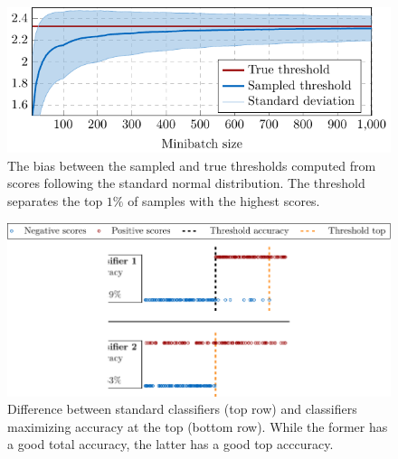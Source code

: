 \begin{figure}[!ht]
  \centering
  \includegraphics[width = \linewidth]{images/deep_threshold_bias.pdf}
  \caption{The bias between the sampled and true thresholds computed from scores following the standard normal distribution. The threshold separates the top $1\%$ of samples with the highest scores.}
  \label{fig:thresholds1}
\end{figure}

\begin{figure}[!ht]
  \centering
  \includegraphics[width = \linewidth]{images/deep_aatp_example.pdf}
  \caption{Difference between standard classifiers (top row) and classifiers maximizing accuracy at the top (bottom row). While the former has a good total accuracy, the latter has a good top acccuracy.}
  \label{fig:difference}
\end{figure}

